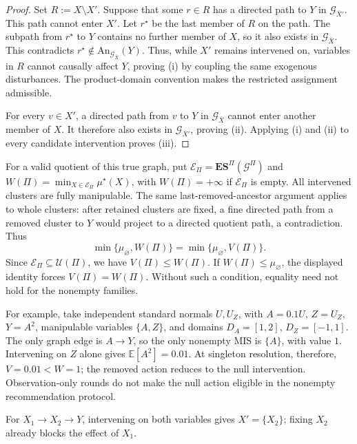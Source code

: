 \documentclass[twoside]{article}
\newcommand{\E}{\mathbb{E}}
\newcommand{\An}{\mathrm{An}}
\newcommand{\Gg}{\mathcal{G}}
\newcommand{\ESpi}{\mathbf{ES}^{\Pi}}
\begin{document}
\begin{proof}
Set \(R:=X\setminus X'\). Suppose that some \(r\in R\) has a directed path to \(Y\) in \(\mathcal G_{\bar X'}\). This path cannot enter \(X'\). Let \(r^\star\) be the last member of \(R\) on the path. The subpath from \(r^\star\) to \(Y\) contains no further member of \(X\), so it also exists in \(\mathcal G_{\bar X}\). This contradicts \(r^\star\notin\An_{\mathcal G_{\bar X}}(Y)\). Thus, while \(X'\) remains intervened on, variables in \(R\) cannot causally affect \(Y\), proving (i) by coupling the same exogenous disturbances. The product-domain convention makes the restricted assignment admissible.

For every \(v\in X'\), a directed path from \(v\) to \(Y\) in \(\mathcal G_{\bar X}\) cannot enter another member of \(X\). It therefore also exists in \(\mathcal G_{\bar X'}\), proving (ii). Applying (i) and (ii) to every candidate intervention proves (iii).
\end{proof}
 
For a valid quotient of this true graph, put \(\mathcal E_\Pi=\ESpi(\Gg^{\Pi})\) and \(W(\Pi)=\min_{X\in\mathcal E_\Pi}\mu^\star(X)\), with \(W(\Pi)=+\infty\) if \(\mathcal E_\Pi\) is empty. All intervened clusters are fully manipulable. The same last-removed-ancestor argument applies to whole clusters: after retained clusters are fixed, a fine directed path from a removed cluster to \(Y\) would project to a directed quotient path, a contradiction. Thus
\[
 \min\{\mu_{\varnothing},W(\Pi)\}
 =\min\{\mu_{\varnothing},V(\Pi)\}.
\]
Since \(\mathcal E_\Pi\subseteq\mathcal U(\Pi)\), we have \(V(\Pi)\le W(\Pi)\). If \(W(\Pi)\le\mu_{\varnothing}\), the displayed identity forces \(V(\Pi)=W(\Pi)\). Without such a condition, equality need not hold for the nonempty families.

For example, take independent standard normals \(U,U_Z\), with \(A=0.1U\), \(Z=U_Z\), \(Y=A^2\), manipulable variables \(\{A,Z\}\), and domains \(D_A=[1,2]\), \(D_Z=[-1,1]\). The only graph edge is \(A\to Y\), so the only nonempty MIS is \(\{A\}\), with value \(1\). Intervening on \(Z\) alone gives \(\E[A^2]=0.01\). At singleton resolution, therefore, \(V=0.01<W=1\); the removed action reduces to the null intervention. Observation-only rounds do not make the null action eligible in the nonempty recommendation protocol.

For \(X_1\to X_2\to Y\), intervening on both variables gives \(X'=\{X_2\}\); fixing \(X_2\) already blocks the effect of \(X_1\).
\end{document}
